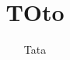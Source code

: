 \documentclass[A4]{article}
\title{TOto}
\author{Tata}
\begin{document}
\maketitle
   
   
\pagebreak
\tableofcontents

\pagebreak

\end{document}
